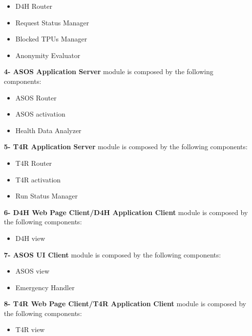 \begin{itemize}
\item D4H Router
\item Request Status Manager
\item Blocked TPUs Manager
\item Anonymity Evaluator
\end{itemize}
\textbf{4- ASOS Application Server} module is composed by the following components:
\begin{itemize}
\item ASOS Router
\item ASOS activation
\item Health Data Analyzer
\end{itemize}
\textbf{5- T4R Application Server} module is composed by the following components:
\begin{itemize}
\item T4R Router
\item T4R activation
\item Run Status Manager
\end{itemize}
\textbf{6- D4H Web Page Client/D4H Application Client} module is composed by the following components:
\begin{itemize}
\item D4H view
\end{itemize}
\textbf{7- ASOS UI Client} module is composed by the following components:
\begin{itemize}
\item ASOS view
\item Emergency Handler
\end{itemize}
\textbf{8- T4R Web Page Client/T4R Application Client} module is composed by the following components:
\begin{itemize}
\item T4R view
\end{itemize}
